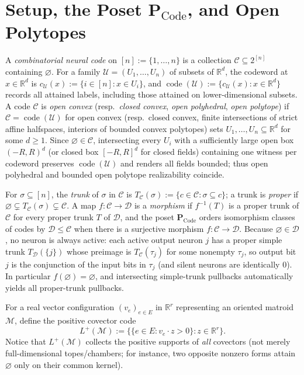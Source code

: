 \documentclass[11pt]{article}
\theoremstyle{plain}
\theoremstyle{definition}
\theoremstyle{remark}
\DeclareMathOperator{\code}{code}
\newcommand{\PCode}{\mathbf{P}_{\mathrm{Code}}}
\begin{document}
\section{Setup, the Poset \texorpdfstring{$\PCode$}{P\_Code}, and Open Polytopes}

A \emph{combinatorial neural code} on $[n] := \{1, \dots, n\}$ is a collection $\mathcal{C} \subseteq 2^{[n]}$ containing $\varnothing$.
For a family $\mathcal{U} = (U_1, \dots, U_n)$ of subsets of $\mathbb{R}^d$, the codeword at $x \in \mathbb{R}^d$ is $c_{\mathcal{U}}(x) := \{i \in [n] : x \in U_i\}$, and $\code(\mathcal{U}) := \{c_{\mathcal{U}}(x) : x \in \mathbb{R}^d\}$ records all attained labels, including those attained on lower-dimensional subsets.
A code $\mathcal{C}$ is \emph{open convex} (resp.\ \emph{closed convex}, \emph{open polyhedral}, \emph{open polytope}) if $\mathcal{C} = \code(\mathcal{U})$ for open convex (resp.\ closed convex, finite intersections of strict affine halfspaces, interiors of bounded convex polytopes) sets $U_1, \dots, U_n \subseteq \mathbb{R}^d$ for some $d \ge 1$.
Since $\varnothing \in \mathcal{C}$, intersecting every $U_i$ with a sufficiently large open box $(-R, R)^d$ (or closed box $[-R, R]^d$ for closed fields) containing one witness per codeword preserves $\code(\mathcal{U})$ and renders all fields bounded; thus open polyhedral and bounded open polytope realizability coincide.

For $\sigma \subseteq [n]$, the \emph{trunk} of $\sigma$ in $\mathcal{C}$ is $T_{\mathcal{C}}(\sigma) := \{c \in \mathcal{C} : \sigma \subseteq c\}$; a trunk is \emph{proper} if $\varnothing \subsetneq T_{\mathcal{C}}(\sigma) \subsetneq \mathcal{C}$.
A map $f : \mathcal{C} \to \mathcal{D}$ is a \emph{morphism} if $f^{-1}(T)$ is a proper trunk of $\mathcal{C}$ for every proper trunk $T$ of $\mathcal{D}$, and the poset $\PCode$ orders isomorphism classes of codes by $\mathcal{D} \le \mathcal{C}$ when there is a surjective morphism $f : \mathcal{C} \to \mathcal{D}$.
Because $\varnothing \in \mathcal{D}$, no neuron is always active: each active output neuron $j$ has a proper simple trunk $T_{\mathcal{D}}(\{j\})$ whose preimage is $T_{\mathcal{C}}(\tau_j)$ for some nonempty $\tau_j$, so output bit $j$ is the conjunction of the input bits in $\tau_j$ (and silent neurons are identically $0$). In particular $f(\varnothing) = \varnothing$, and intersecting simple-trunk pullbacks automatically yields all proper-trunk pullbacks.

For a real vector configuration $(v_e)_{e \in E}$ in $\mathbb{R}^r$ representing an oriented matroid $\mathcal{M}$, define the positive covector code
\[
L^+(\mathcal{M}) := \bigl\{\{e \in E : v_e \cdot z > 0\} : z \in \mathbb{R}^r\bigr\}.
\]
Notice that $L^+(\mathcal{M})$ collects the positive supports of \emph{all} covectors (not merely full-dimensional topes/chambers; for instance, two opposite nonzero forms attain $\varnothing$ only on their common kernel).
\end{document}
